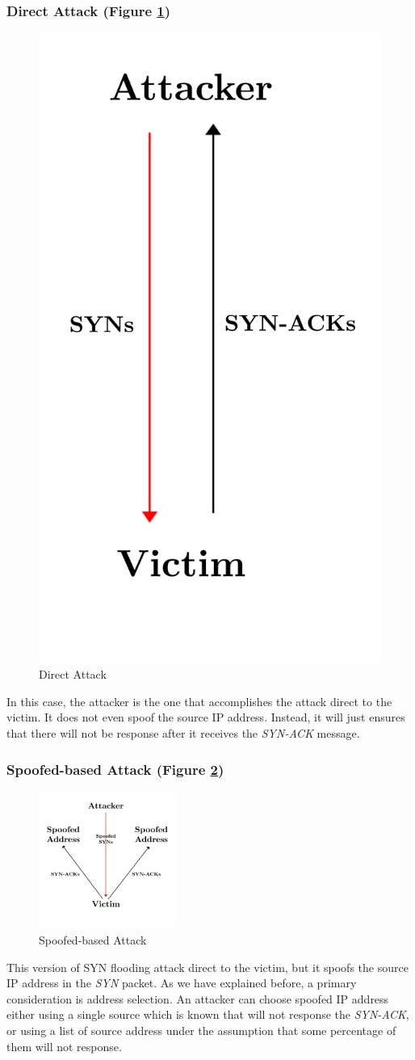 \subsubsection{Direct Attack (Figure \ref{fig:DirectAttackSYN}) }
\label{subsec:SYNDirectAttack}

\begin{figure}[H]
\centering
\includegraphics[height=0.4\textwidth]{./images/DirectAttackSYN.pdf}
\caption{Direct Attack} \label{fig:DirectAttackSYN}
\end{figure}

In this case, the attacker is the one that accomplishes the attack direct to the victim. It does not even spoof the source IP address. Instead, it will just ensures that there will not be response after it receives the \textit{SYN-ACK} message.

\subsubsection{Spoofed-based Attack (Figure \ref{fig:SpoofedAttackSYN})}
\label{subsec:SYNSpoofedAttack}

\begin{figure}[H]
\centering
\includegraphics[width=0.4\textwidth]{./images/SpoofedAttackSYN.pdf}
\caption{Spoofed-based Attack} \label{fig:SpoofedAttackSYN}
\end{figure}

This version of SYN flooding attack direct to the victim, but it spoofs the source IP address in the \textit{SYN} packet. As we have explained before, a primary consideration is address selection. An attacker can choose spoofed IP address either using a single source which is known that will not response the \textit{SYN-ACK}, or using a list of source address under the assumption that some percentage of them will not response.


